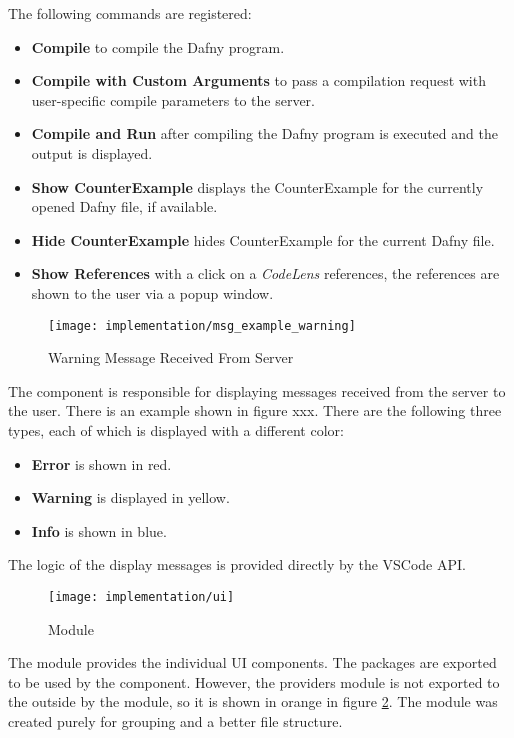 The following commands are registered:
\begin{itemize}
    \item {\bf Compile} \textendash{} to compile the Dafny program.
    \item {\bf Compile with Custom Arguments} \textendash{} to pass a compilation request with user-specific
    compile parameters to the server.
    \item {\bf Compile and Run} \textendash{} after compiling the Dafny program is executed and the output is displayed.
    \item {\bf Show CounterExample} \textendash{} displays the CounterExample for the currently opened Dafny file, if available.
    \item {\bf Hide CounterExample} \textendash{} hides CounterExample for the current Dafny file.
    \item {\bf Show References} \textendash{} with a click on a \textit{CodeLens} references,
    the references are shown to the user via a popup window.
\end{itemize}

\begin{figure}[H]
    \centering
    \texttt{[image: implementation/msg\_example\_warning]}
    \caption{Warning Message Received From Server}
    \label{fig:msg_example}
\end{figure}

The  component is responsible for displaying messages received from the server to the user.
There is an example shown in figure xxx.
There are the following three types, each of which is displayed with a different color:

\begin{itemize}
    \item {\bf Error} \textendash{} is shown in red.
    \item {\bf Warning} \textendash{} is displayed in yellow.
    \item {\bf Info} \textendash{} is shown in blue.
\end{itemize}

The logic of the display messages is provided directly by the VSCode API.

\begin{figure}[H]
    \centering
    \texttt{[image: implementation/ui]}
    \caption{Module }
    \label{fig:ui_module}
\end{figure}

The  module provides the individual UI components.
The packages are exported to be used by the  component.
However, the providers module is not exported to the outside by the  module,
so it is shown in orange in figure \ref{fig:ui_module}.
The module was created purely for grouping and a better file structure.\\

